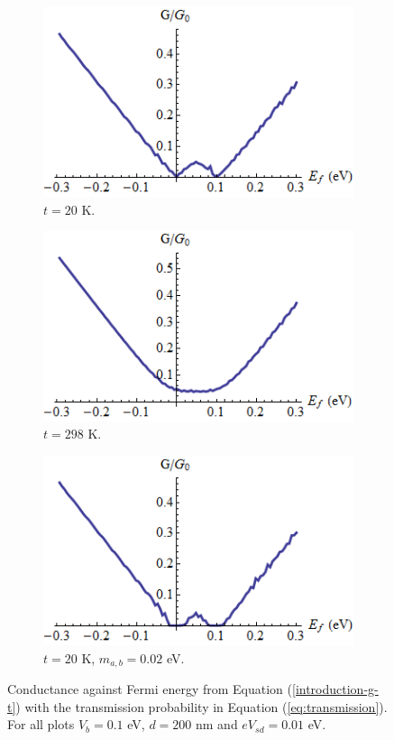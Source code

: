 		\begin{figure}[h]
			 \begin{subfigure}[h]{0.3\textwidth}
				\centerline{\includegraphics[scale=0.35]{images/pot-g-1}}
				\caption{$t=20$ K.}
			\end{subfigure}
			\hspace{0.5cm}
			\begin{subfigure}[h]{0.3\textwidth}
				\centerline{\includegraphics[scale=0.35]{images/pot-g-2}}
				\caption{$t=298$ K.}
			\end{subfigure}
			\hspace{0.5cm}
			\begin{subfigure}[h]{0.3\textwidth}
				\centerline{\includegraphics[scale=0.35]{images/pot-g-3}}
				\caption{$t=20$ K, $m_{a,b}=0.02$ eV.}
			\end{subfigure}
			\caption{Conductance against Fermi energy from Equation (\ref{introduction-g-t}) with the transmission probability in Equation (\ref{eq:transmission}). For all plots $V_{b}=0.1$ eV, $d=200$ nm and $eV_{sd}=0.01$ eV.}
			\label{pot-g-1}
		\end{figure}

